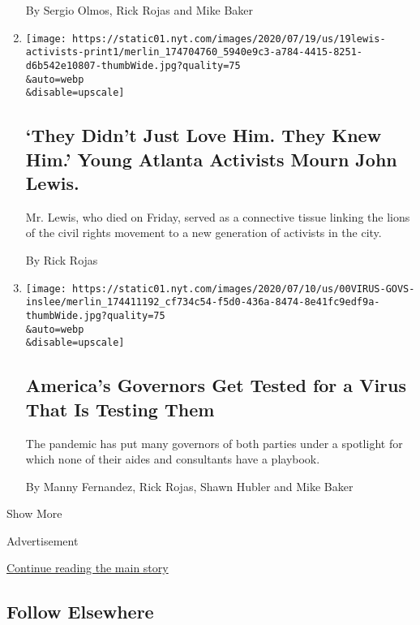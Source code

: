 \begin{enumerate}
  By Sergio Olmos, Rick Rojas and Mike Baker
\item
  \href{/2020/07/18/us/John-Lewis-Atlanta.html}{}

  \texttt{[image: https://static01.nyt.com/images/2020/07/19/us/19lewis-activists-print1/merlin\_174704760\_5940e9c3-a784-4415-8251-d6b542e10807-thumbWide.jpg?quality=75\\\&auto=webp\\\&disable=upscale]}

  \hypertarget{they-didnt-just-love-him-they-knew-him-young-atlanta-activists-mourn-john-lewis}{%
  \subsection{`They Didn't Just Love Him. They Knew Him.' Young Atlanta
  Activists Mourn John
  Lewis.}\label{they-didnt-just-love-him-they-knew-him-young-atlanta-activists-mourn-john-lewis}}

  Mr. Lewis, who died on Friday, served as a connective tissue linking
  the lions of the civil rights movement to a new generation of
  activists in the city.

  By Rick Rojas
\item
  \href{/2020/07/13/us/coronavirus-governors.html}{}

  \texttt{[image: https://static01.nyt.com/images/2020/07/10/us/00VIRUS-GOVS-inslee/merlin\_174411192\_cf734c54-f5d0-436a-8474-8e41fc9edf9a-thumbWide.jpg?quality=75\\\&auto=webp\\\&disable=upscale]}

  \hypertarget{americas-governors-get-tested-for-a-virus-that-is-testing-them}{%
  \subsection{America's Governors Get Tested for a Virus That Is Testing
  Them}\label{americas-governors-get-tested-for-a-virus-that-is-testing-them}}

  The pandemic has put many governors of both parties under a spotlight
  for which none of their aides and consultants have a playbook.

  By Manny Fernandez, Rick Rojas, Shawn Hubler and Mike Baker
\end{enumerate}

Show More

Advertisement

\protect\hyperlink{after-mid2}{Continue reading the main story}

\hypertarget{follow-elsewhere}{%
\subsection{Follow Elsewhere}\label{follow-elsewhere}}

